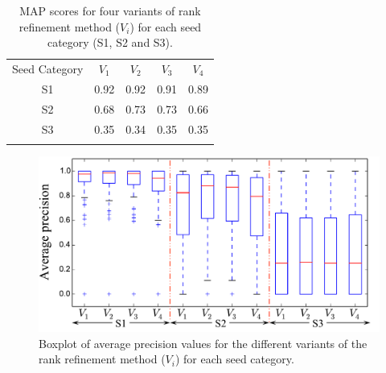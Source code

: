 \begin{table} 
	\begin{centering}	
		\begin{tabular}{ c | c c c c}
			\tabletop
			Seed Category   & $V_1$		&	$V_2$ & $V_3$	 &	$V_4$ 	\\	
			\tablemid
			S1 & 0.92    &	0.92		&	0.91    &	0.89\\
			S2 & 0.68    &	0.73		&	0.73    &	0.66\\
			S3 & 0.35    &	0.34    &	0.35    &	0.35\\
			\tablebot
		\end{tabular}
		\caption{MAP scores for four variants of rank refinement method ($V_i$) for each seed category (S1, S2 and S3).}
		\label{tab:meanAveragePrecision_pattern_discovery}
		\par \end{centering}	
\end{table}

\begin{figure}
	\begin{center}
		\includegraphics[width=\figSizeHundred]{ch06_patterns/figures/discovery/boxPlot.pdf}
	\end{center}
	\caption{Boxplot of average precision values for the different variants of the rank refinement method ($V_i$) for each seed category. }
	\label{fig:boxPlotMAPPatternDiscovery}
\end{figure}


